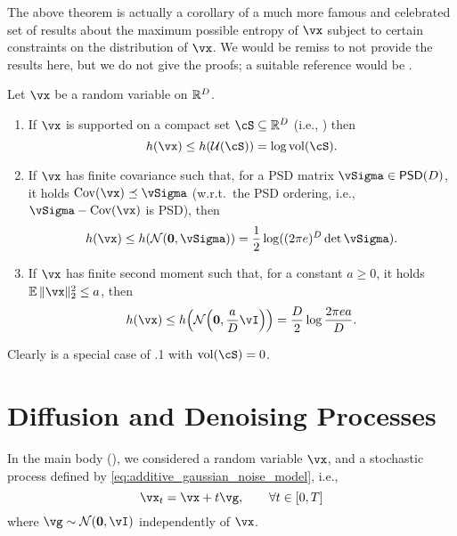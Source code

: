 \documentclass[../../book-main.tex]{subfiles}
\begin{document}
The above theorem is actually a corollary of a much more famous and celebrated set of results about the maximum possible entropy of \(\vx\) subject to certain constraints on the distribution of \(\vx\). We would be remiss to not provide the results here, but we do not give the proofs; a suitable reference would be \cite{poliyanski2024information}.
\begin{theorem}\label{thmx:max_entropy}
    Let \(\vx\) be a random variable on \(\mathbb{R}^{D}\).
    \begin{enumerate}
        \item If \(\vx\) is supported on a compact set \(\cS \subseteq \R^{D}\) (i.e., ) then
        \begin{equation}
            h(\vx) \leq h(\dUnif(\cS)) = \log \volume(\cS).
        \end{equation}
        \item If \(\vx\) has finite covariance such that, for a PSD matrix \(\vSigma \in \PSD(D)\), it holds \(\Cov(\vx) \preceq \vSigma\) (w.r.t.~the PSD ordering, i.e., \(\vSigma - \Cov(\vx)\) is PSD), then
        \begin{equation}
            h(\vx) \leq h(\dNorm(\vzero, \vSigma)) = \frac{1}{2}\log((2\pi e)^{D}\det\vSigma).
        \end{equation}
        \item If \(\vx\) has finite second moment such that, for a constant \(a \geq 0\), it holds \(\Ex\norm{\vx}_{2}^{2} \leq a\), then
        \begin{equation}
            h(\vx) \leq h\rp{\dNorm\rp{\vzero, \frac{a}{D}\vI}} = \frac{D}{2}\log\frac{2\pi e a}{D}.
        \end{equation}
    \end{enumerate}
\end{theorem}
Clearly  is a special case of .1 with \(\volume(\cS) = 0\).



\section{Diffusion and Denoising Processes}\label{sec:entropy_diffusion}

In the main body (), we considered a random variable \(\vx\), and a stochastic process defined by \eqref{eq:additive_gaussian_noise_model}, i.e.,
\begin{equation}\label{eq:app_additive_gaussian_noise_model}
    \vx_{t} = \vx + t\vg, \qquad  \forall t \in [0, T]
\end{equation}
where \(\vg \sim \dNorm(\vzero, \vI)\) independently of \(\vx\). 
\end{document}
